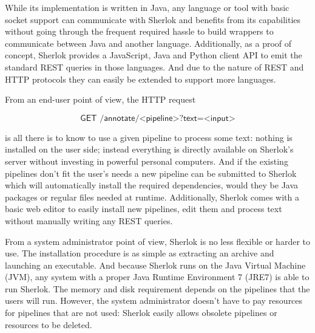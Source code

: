 \documentclass{article}
\newcommand{\TODO}[1]{\texttt{\textcolor{YellowOrange}{(#1)}}} %
\newcommand{\REST}[1]{\textsf{#1}}
\newcommand{\MULTIROW}[2]{\multirow{#1}{*}{\vbox{#2}}}
\begin{document}






While its implementation is written in Java, any language or tool with basic socket support can
communicate with Sherlok and benefits from its capabilities without going through the frequent
required hassle to build wrappers to communicate between Java and another language. Additionally,
as a proof of concept, Sherlok provides a JavaScript, Java and Python client API to emit the
standard REST queries in those languages. And due to the nature of REST and HTTP protocols they can
easily be extended to support more languages.

From an end-user point of view, the HTTP request

\[
    \REST{GET /annotate/<pipeline>?text=<input>}
\]

is all there is to know to use a given pipeline to process some text: nothing is installed on the
user side; instead everything is directly available on Sherlok's server without investing in
powerful personal computers. And if the existing pipelines don't fit the user's needs a new pipeline
can be submitted to Sherlok which will automatically install the required dependencies, would they
be Java packages or regular files needed at runtime. Additionally, Sherlok comes with a basic web
editor to easily install new pipelines, edit them and process text without manually writing any REST
queries.

From a system administrator point of view, Sherlok is no less flexible or harder to use. The
installation procedure is as simple as extracting an archive and launching an executable. And
because Sherlok runs on the Java Virtual Machine (JVM), any system with a proper Java Runtime
Environment 7 (JRE7) is able to run Sherlok. The memory and disk requirement depends on the
pipelines that the users will run. However, the system administrator doesn't have to pay resources
for pipelines that are not used: Sherlok easily allows obsolete pipelines or resources to be
deleted.
\end{document}
